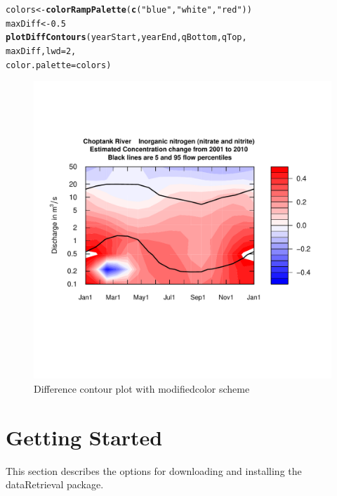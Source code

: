 \documentclass[a4paper,11pt]{article}\usepackage{graphicx, color}
\makeatletter
\newcommand{\hlfunctioncall}[1]{\textcolor[rgb]{0.501960784313725,0,0.329411764705882}{\textbf{#1}}}%
\newcommand{\hlstring}[1]{\textcolor[rgb]{0.6,0.6,1}{#1}}%
\newenvironment{kframe}{%
 \def\at@end@of@kframe{}%
 \ifinner\ifhmode%
  \def\at@end@of@kframe{\end{minipage}}%
  \begin{minipage}{\columnwidth}%
 \fi\fi%
 \def\FrameCommand##1{\hskip\@totalleftmargin \hskip-\fboxsep
 \colorbox{shadecolor}{##1}\hskip-\fboxsep
     \hskip-\linewidth \hskip-\@totalleftmargin \hskip\columnwidth}%
 \MakeFramed {\advance\hsize-\width
   \@totalleftmargin\z@ \linewidth\hsize
   \@setminipage}}%
 {\par\unskip\endMakeFramed%
 \at@end@of@kframe}
\newenvironment{knitrout}{}{} %
\makeatother
\begin{document}
\begin{knitrout}
\color{fgcolor}\begin{kframe}
\begin{alltt}
colors <- \hlfunctioncall{colorRampPalette}(\hlfunctioncall{c}(\hlstring{"blue"},\hlstring{"white"},\hlstring{"red"}))
maxDiff<-0.5
\hlfunctioncall{plotDiffContours}(yearStart,yearEnd,qBottom,qTop, 
             maxDiff,lwd=2,
             color.palette=colors)
\end{alltt}
\end{kframe}\begin{figure}[]

\includegraphics[width=1\linewidth,height=1\linewidth]{figure/modifiedDiffContour} \caption[Difference contour plot with modifiedcolor scheme]{Difference contour plot with modifiedcolor scheme\label{fig:modifiedDiffContour}}
\end{figure}


\end{knitrout}



\FloatBarrier



\appendix
\section{Getting Started}
\label{sec:appendix1}
This section describes the options for downloading and installing the dataRetrieval package.
\end{document}
